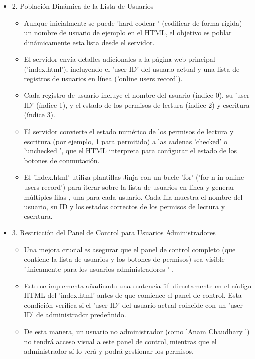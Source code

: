 \documentclass{report}
\begin{document}
\begin{itemize}
    \item 2. Población Dinámica de la Lista de Usuarios
    \begin{itemize}
        \item Aunque inicialmente se puede  'hard-codear ' (codificar de forma rígida) un nombre de usuario de ejemplo en el HTML, el objetivo es  
        poblar dinámicamente esta lista  desde el servidor.
        \item El servidor envía detalles adicionales a la página web principal ('index.html'), incluyendo el 'user ID' del usuario actual y una  
        lista de registros de usuarios en línea  ('online users record').
        \item Cada registro de usuario incluye el nombre del usuario (índice 0), su 'user ID' (índice 1), y el estado de los permisos de lectura 
        (índice 2) y escritura (índice 3).
        \item El servidor convierte el estado numérico de los permisos de lectura y escritura (por ejemplo, 1 para permitido) a las cadenas 
        'checked' o  'unchecked ', que el HTML interpreta para configurar el estado de los botones de conmutación.
        \item El 'index.html' utiliza  plantillas Jinja  con un  bucle 'for' ('for n in online users record')  para iterar sobre la lista de 
        usuarios en línea y generar  múltiples filas , una para cada usuario. Cada fila muestra el nombre del usuario, su ID y los estados correctos 
        de los permisos de lectura y escritura.
    \end{itemize}

    \item 3. Restricción del Panel de Control para Usuarios Administradores
    \begin{itemize}
        \item Una mejora crucial es asegurar que  el panel de control completo (que contiene la lista de usuarios y los botones de permisos) 
        sea visible  'únicamente para los usuarios administradores ' .
        \item Esto se implementa añadiendo una  sentencia 'if' directamente en el código HTML  del 'index.html' antes de que comience el panel 
        de control. Esta condición verifica si el 'user ID' del usuario actual coincide con un 'user ID' de administrador predefinido.
        \item De esta manera, un  usuario no administrador  (como  'Anam Chaudhary ') no tendrá acceso visual a este panel de control, mientras 
        que el administrador sí lo verá y podrá gestionar los permisos.
    \end{itemize}


\end{itemize}
\end{document}
